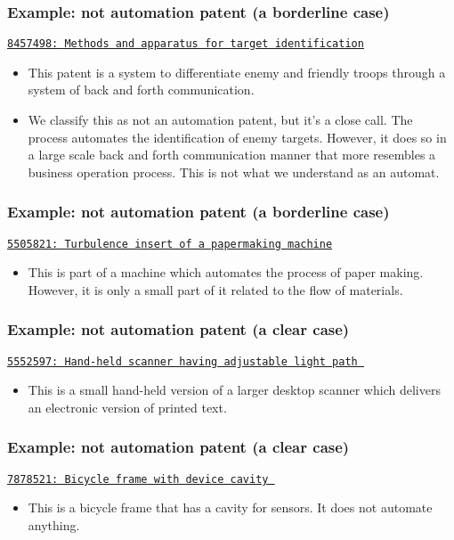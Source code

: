 \documentclass[10pt]{beamer}
\begin{document}
\begin{frame}\frametitle{Example:  \textcolor{myred}{\textbf{not}} automation patent (a borderline case)}
\href{https://www.google.de/patents/US8457498}{\texttt{8457498: Methods and apparatus for target identification}}
	\begin{itemize}	
	\item This patent is a system to differentiate enemy and friendly troops through a system of back and forth communication. 
	\item We classify this as not an automation patent, but it's a close call. The process automates the identification of enemy targets. However, it does so in a large scale back and forth communication manner that more resembles a business operation process. This is not what we understand as an automat.
	\end{itemize}
\end{frame}


\begin{frame}\frametitle{Example: \textcolor{myred}{\textbf{not}} automation patent (a borderline case)}
\href{https://www.google.de/patents/US5505821}{\texttt{5505821: Turbulence insert of a papermaking machine}}
	\begin{itemize}	
	\item This is part of a machine which automates the process of paper making. However, it is only a small part of it related to the flow of materials.
	\end{itemize}
\end{frame}


\begin{frame}\frametitle{Example: \textcolor{myred}{\textbf{not}} automation patent (a clear case)}
\href{https://www.google.de/patents/US5552597}{\texttt{5552597: Hand-held scanner having adjustable light path }}
	\begin{itemize}	
	\item This is a small hand-held version of a larger desktop scanner which delivers an electronic version of printed text. 
	\end{itemize}
\end{frame}


\begin{frame}\frametitle{Example: \textcolor{myred}{\textbf{not}} automation patent (a clear case)}
\href{https://www.google.de/patents/US7878521}{\texttt{7878521: Bicycle frame with device cavity }}
	\begin{itemize}	
	\item This is a bicycle frame that has a cavity for sensors. It does not automate anything.
	\end{itemize}
\end{frame}
\end{document}
